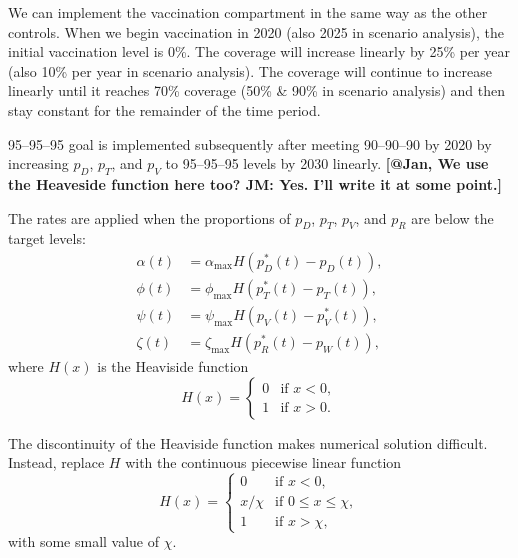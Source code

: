 \documentclass[11pt]{article}
\newcommand{\comment}[1]{\textbf{[#1]}}
\begin{document}
We can implement the vaccination compartment in the same way as the
other controls. When we begin vaccination in 2020 (also 2025 in
scenario analysis), the initial vaccination level is 0\%. The coverage
will increase linearly by 25\% per year (also 10\% per year in
scenario analysis). The coverage will continue to increase linearly
until it reaches 70\% coverage (50\% \& 90\% in scenario analysis) and
then stay constant for the remainder of the time period.

95--95--95 goal is implemented subsequently after meeting 90--90--90
by 2020 by increasing $p_D$, $p_T$, and $p_V$ to 95--95--95 levels by
2030 linearly. \comment{@Jan, We use the Heaveside function here too?
JM: Yes.  I'll write it at some point.}

The rates are applied when the proportions of $p_D$, $p_T$, $p_V$, and
$p_R$ are below the target levels:
\begin{equation}
  \label{target_rates}
  \begin{split}
    \alpha(t) &= \alpha_{\max} H\left(p_D^*(t) - p_D(t)\right),
    \\
    \phi(t) &= \phi_{\max} H\left(p_T^*(t) - p_T(t)\right),
    \\
    \psi(t) &= \psi_{\max} H\left(p_V(t) - p_V^*(t)\right),
    \\
    \zeta(t) &= \zeta_{\max} H\left(p^{*}_{R}(t) - p_{W}(t)\right),
  \end{split}
\end{equation}
where $H(x)$ is the Heaviside function
\begin{equation}
  H(x) =
  \begin{cases}
    0 & \text{if $x < 0$},
    \\
    1 & \text{if $x > 0$}.
  \end{cases}
\end{equation}

The discontinuity of the Heaviside function makes numerical solution
difficult.  Instead, replace $H$ with the continuous piecewise linear
function
\begin{equation}
  H(x) =
  \begin{cases}
    0 & \text{if $x < 0$},
    \\
    x / \chi & \text{if $0 \leq x \leq \chi$},
    \\
    1 & \text{if $x > \chi$},
  \end{cases}
\end{equation}
with some small value of $\chi$.
\end{document}
